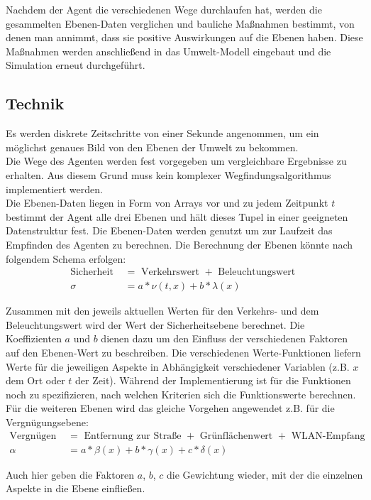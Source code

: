 \documentclass[10pt]{scrartcl}
\begin{document}
Nachdem der Agent die verschiedenen Wege durchlaufen hat, werden die gesammelten Ebenen-Daten verglichen und bauliche Maßnahmen bestimmt, von denen man annimmt, dass sie positive Auswirkungen auf die Ebenen haben. Diese Maßnahmen werden anschließend in das Umwelt-Modell eingebaut und die Simulation erneut durchgeführt.

\subsection{Technik}
Es werden diskrete Zeitschritte von einer Sekunde angenommen, um ein möglichst genaues Bild von den Ebenen der Umwelt zu bekommen.\\
Die Wege des Agenten werden fest vorgegeben um vergleichbare Ergebnisse zu erhalten. Aus diesem Grund muss kein komplexer Wegfindungsalgorithmus implementiert werden.\\
Die Ebenen-Daten liegen in Form von Arrays vor und zu jedem Zeitpunkt $t$ bestimmt der Agent alle drei Ebenen und hält dieses Tupel in einer geeigneten Datenstruktur fest. Die Ebenen-Daten werden genutzt um zur Laufzeit das Empfinden des Agenten zu berechnen.
Die Berechnung der Ebenen könnte nach folgendem Schema erfolgen:
\begin{align}
	\text{Sicherheit } &= \text{ Verkehrswert } + \text{ Beleuchtungswert }\\
	\sigma &= a * \nu(t,x) + b * \lambda(x)
\end{align}

Zusammen mit den jeweils aktuellen Werten für den Verkehrs- und dem Beleuchtungswert wird der Wert der Sicherheitsebene berechnet.
Die Koeffizienten $a$ und $b$ dienen dazu um den Einfluss der verschiedenen Faktoren auf den Ebenen-Wert zu beschreiben.
Die verschiedenen Werte-Funktionen liefern Werte für die jeweiligen Aspekte in Abhängigkeit verschiedener Variablen (z.B. $x$ dem Ort oder $t$ der Zeit).
Während der Implementierung ist für die Funktionen noch zu spezifizieren, nach welchen Kriterien sich die Funktionswerte berechnen.
Für die weiteren Ebenen wird das gleiche Vorgehen angewendet z.B. für die Vergnügungsebene:
\begin{align}
	\text{Vergnügen } &= \text{ Entfernung zur Straße } + \text{ Grünflächenwert } + \text{ WLAN-Empfang}\\
	\alpha &= a * \beta(x) + b * \gamma(x) + c * \delta(x)
\end{align}

Auch hier geben die Faktoren $a$, $b$, $c$ die Gewichtung wieder, mit der die einzelnen Aspekte in die Ebene einfließen.
\end{document}

